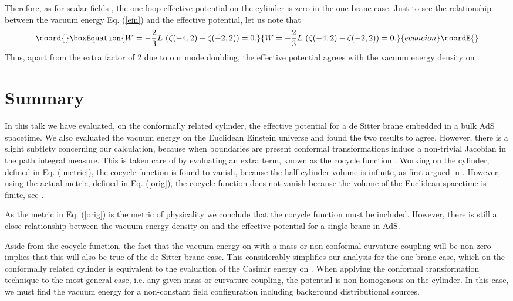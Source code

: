 \documentclass[a4paper,a4paper]{article}
\begin{document}
Therefore, as for scalar fields \cite{NOZ,NS}, the one loop effective potential 
on the cylinder is zero in the one brane case. 
Just to see the relationship between the vacuum energy Eq. (\ref{ein}) and the 
effective potential, let us note that
\begin{equation}\coord{}\boxEquation{
W=-\frac 2 3 L\,\left(\zeta(-4,2)-\zeta(-2,2)\right)=0.
}{
W=-\frac 2 3 L\,\left(\zeta(-4,2)-\zeta(-2,2)\right)=0.
}{ecuacion}\coordE{}\end{equation}
Thus, apart from the extra factor of 2 due to our mode doubling, the effective 
potential agrees with the vacuum energy density on \coordHE{}.

\section{Summary}

In this talk we have evaluated, on the conformally related cylinder, the effective potential for a 
de Sitter brane embedded in a bulk AdS\coordHE{} spacetime. We also evaluated the vacuum 
energy on the Euclidean Einstein universe \coordHE{} and found the two results 
to agree. However, there is a slight subtlety concerning our calculation, because 
when boundaries are present conformal transformations induce a 
non-trivial Jacobian in the path integral measure. This is taken care of by evaluating an 
extra term, known as the cocycle function \cite{MNSS}. Working on the cylinder, 
defined in Eq. (\ref{metric}), the cocycle function is found to vanish, because the 
half-cylinder volume is infinite, as first argued in \cite{NOZ}. However, using the actual 
metric, defined in Eq. (\ref{orig}), the cocycle function does not vanish because the 
volume of the Euclidean spacetime is finite, see \cite{MNSS}.

As the metric in Eq. (\ref{orig}) is the metric of physicality we conclude that the 
cocycle function must be included. However, there is still a close relationship between 
the vacuum energy density on \coordHE{} and the effective potential for a 
single \coordHE{} brane in AdS\coordHE{}.


Aside from the cocycle function, the fact that the vacuum energy on \coordHE{} 
with a mass or non-conformal curvature coupling will be non-zero implies that this 
will also be true of the de Sitter brane case. 
This considerably simplifies our analysis for the one brane case, which on the conformally 
related cylinder is equivalent to the evaluation of the Casimir energy on \coordHE{}.
When applying the conformal transformation technique to the most general case, i.e. 
any given mass or curvature coupling, the potential is non-homogenous on the cylinder.
In this case, we must find the vacuum energy for a non-constant field 
configuration including background distributional sources.
\end{document}
